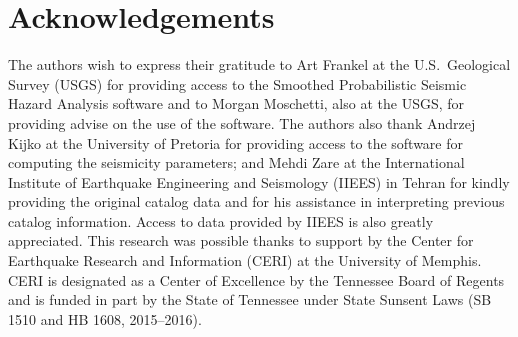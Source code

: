 \section{Acknowledgements}

The authors wish to express their gratitude to Art Fran\-kel at the U.S.~Geological Survey (USGS) for providing access to the Smoothed Probabilistic Seismic Hazard Analysis software and to Morgan Moschetti, also at the USGS, for providing advise on the use of the software. The authors also thank Andrzej Kijko at the University of Pretoria for providing access to the software for computing the seismicity parameters; and Mehdi Zare at the International Institute of Earthquake Engineering and Seismology (IIEES) in Tehran for kindly providing the original catalog data and for his assistance in interpreting previous catalog information. Access to data provided by IIEES is also greatly appreciated. This research was possible thanks to support by the Center for Earthquake Research and Information (CERI) at the University of Memphis. CERI is designated as a Center of Excellence by the Tennessee Board of Regents and is funded in part by the State of Tennessee under State Sunsent Laws (SB 1510 and HB 1608, 2015--2016).
 